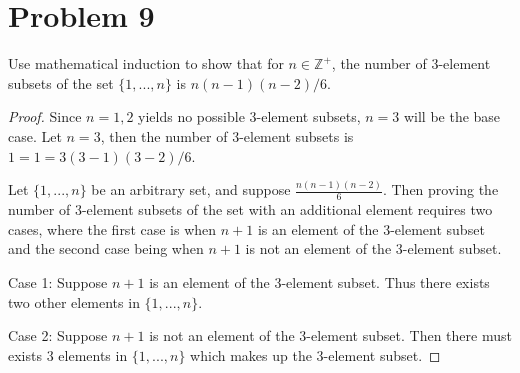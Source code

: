 \documentclass{article}
\begin{document}

    \section*{Problem 9}

    Use mathematical induction to show that for $n\in\mathbb{Z}^+$, the number of 3-element
    subsets of the set $\{1,...,n\}$ is $n(n-1)(n-2)/6$.

    \begin{proof}
        Since $n=1,2$ yields no possible 3-element subsets, $n=3$ will be the base case.
        Let $n=3$, then the number of 3-element subsets is $1=1=3(3-1)(3-2)/6$.

        Let $\{1,...,n\}$ be an arbitrary set, and suppose $\frac{n(n-1)(n-2)}{6}$.
        Then proving the number of 3-element subsets of the set with an additional element requires
        two cases, where the first case is when $n+1$ is an element of the 3-element subset and
        the second case being when $n+1$ is not an element of the 3-element subset.

        Case 1: Suppose $n+1$ is an element of the 3-element subset. Thus there exists two 
        other elements in $\{1,...,n\}$. 

        Case 2: Suppose $n+1$ is not an element of the 3-element subset. Then there must
        exists 3 elements in $\{1,...,n\}$ which makes up the 3-element subset. 
    \end{proof}
\end{document}

